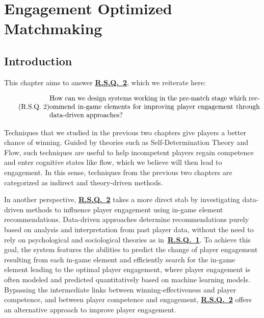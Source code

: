 \chapter{Engagement Optimized Matchmaking} 

\label{chapter:eomm} 

\section{Introduction}\label{sec:eomm_intro}
This chapter aims to answer \hyperref[rq2]{\textbf{R.S.Q.~2}}, which we reiterate here:

\begin{equation}
  \tag{R.S.Q.~2}\label{rq2}
  \parbox{\dimexpr\linewidth-4em}{%
    \strut
    How can we design systems working in the pre-match stage which recommend in-game elements for improving player engagement through data-driven approaches?
    \strut
  }
\end{equation}

Techniques that we studied in the previous two chapters give players a better chance of winning. Guided by theories such as Self-Determination Theory and Flow, such techniques are useful to help incompetent players regain competence and enter cognitive states like flow, which we believe will then lead to engagement. In this sense, techniques from the previous two chapters are categorized as indirect and theory-driven methods.

In another perspective, \hyperref[rq2]{\textbf{R.S.Q.~2}} takes a more direct stab by investigating data-driven methods to influence player engagement using in-game element recommendations. Data-driven approaches determine recommendations purely based on analysis and interpretation from past player data, without the need to rely on psychological and sociological theories as in~\hyperref[rq1]{\textbf{R.S.Q.~1}}.
To achieve this goal, the system features the abilities to predict the change of player engagement resulting from each in-game element and efficiently search for the in-game element leading to the optimal player engagement, where player engagement is often modeled and predicted quantitatively based on machine learning models. Bypassing the intermediate links between winning-effectiveness and player competence, and between player competence and engagement, \hyperref[rq2]{\textbf{R.S.Q.~2}} offers an alternative approach to improve player engagement.




